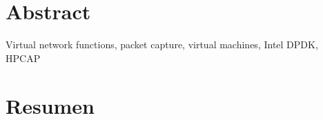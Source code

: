 \chapter*{Abstract}

\begin{abstractEn}

\end{abstractEn}

\begin{keywordsEn}
Virtual network functions, packet capture, virtual machines, Intel DPDK, HPCAP
\end{keywordsEn}

\chapter*{Resumen}

\begin{abstractEs}


\end{abstractEs}

\begin{keywordsEs}

\end{keywordsEs}
